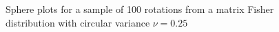 \documentclass[12pt]{article}
\begin{document}
\begin{figure}
\centering
{}
\caption{\label{fig:eye-fisher}Sphere plots for a sample of 100 rotations from a matrix Fisher distribution with circular variance $\nu=0.25$}
\end{figure}
\end{document}
